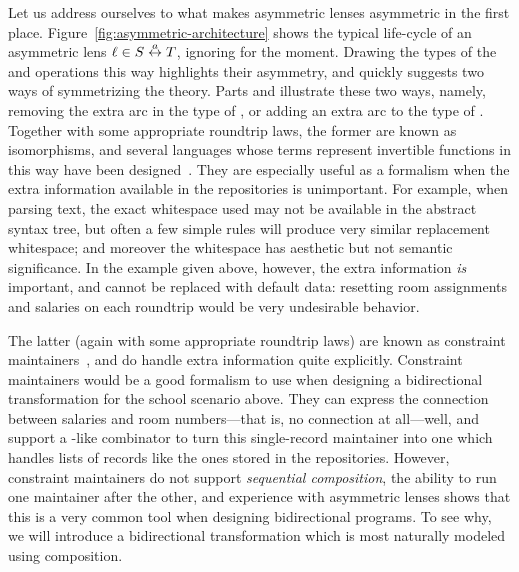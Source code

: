 Let us address ourselves to what makes asymmetric lenses asymmetric in the
first place. Figure~\ref{fig:asymmetric-architecture} shows the typical
life-cycle of an asymmetric lens $\ell \in S \overset{a}{\leftrightarrow} T$, ignoring \CREATE for
the moment. Drawing the types of the \GET and \PUT operations this way
highlights their asymmetry, and quickly suggests two ways of symmetrizing
the theory. Parts  and
 illustrate these two ways,
namely, removing the extra arc in the type of \PUT, or adding an extra arc
to the type of \GET. Together with some appropriate roundtrip laws, the
former are known as isomorphisms, and several languages whose terms
represent invertible functions in this way have been
designed~\cite{xsugar,rendel2010invertible}. They are especially useful as a
formalism when the extra information available in the repositories is
unimportant. For example, when parsing text, the exact whitespace used may
not be available in the abstract syntax tree, but often a few simple rules
will produce very similar replacement whitespace; and moreover the
whitespace has aesthetic but not semantic significance. In the example given
above, however, the extra information \emph{is} important, and cannot be
replaced with default data: resetting room assignments and salaries on each
roundtrip would be very undesirable behavior.

The latter (again with some appropriate roundtrip laws) are known as
constraint maintainers~\cite{Meertens98}, and do handle extra information
quite explicitly. Constraint maintainers would be a good formalism to use
when designing a bidirectional transformation for the school scenario above.
They can express the connection between salaries and room numbers---that is,
no connection at all---well, and support a \map-like combinator to turn this
single-record maintainer into one which handles lists of records like the
ones stored in the repositories. However, constraint maintainers do not
support \emph{sequential composition}, the ability to run one maintainer
after the other, and experience with asymmetric lenses shows that this is a
very common tool when designing bidirectional programs. To see why, we will
introduce a bidirectional transformation which is most naturally modeled
using composition.

